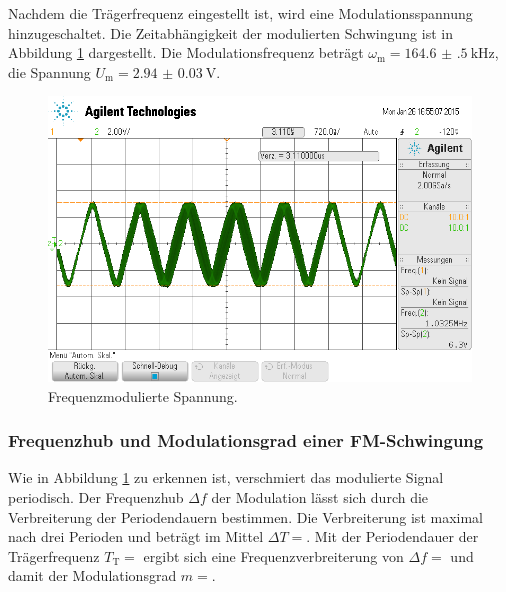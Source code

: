 Nachdem die Trägerfrequenz eingestellt ist, wird eine Modulationsspannung
hinzugeschaltet. Die Zeitabhängigkeit der modulierten Schwingung ist in
Abbildung \ref{fig:fm-zeitabh} dargestellt.
Die Modulationsfrequenz beträgt $\omega_\text{m} = \SI{164.6(5)}{\kilo\hertz}$,
die Spannung $U_\text{m} = \SI{2.94(3)}{\volt}$.
\begin{figure}
        \centering
        \includegraphics[width=0.8\linewidth]{images/fm-zeitabh.png}
        \caption{Frequenzmodulierte Spannung.}
        \label{fig:fm-zeitabh}
\end{figure}

\subsubsection{Frequenzhub und Modulationsgrad einer FM-Schwingung}
\label{subsubsec:fm-modulationsgrad}
Wie in Abbildung \ref{fig:fm-zeitabh} zu erkennen ist, verschmiert das
modulierte Signal periodisch.
Der Frequenzhub $\Delta f$ der Modulation lässt sich durch die Verbreiterung
der Periodendauern bestimmen.
Die Verbreiterung ist maximal nach drei Perioden und beträgt im Mittel
$\Delta T = $. Mit der Periodendauer der
Trägerfrequenz $T_\text{T} = $ ergibt sich eine
Frequenzverbreiterung von $\Delta f = $ und
damit der Modulationsgrad $m = $.
